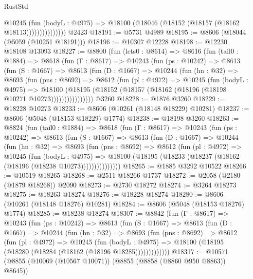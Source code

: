 \begin{lexlean}{RustStd}
\begin{coremodule}
                      @10245
                        (fun (bodyL : @4975) =>
                        @18100 (@18046 (@18152 (@18157 (@18162 @18113)))))))))))))))
    @2423
@18191 := @5731 @4989
@18195 := @8606 (@18044 (@5059 (@10251 @18191)))
@18196 := @10307 @12228
@18198 := @12230 @18108 @13093
@18227 := @8800
    (fun (lets0 : @8614) =>
    @8616
      (fun (tail0 : @1884) =>
      @8618
        (fun (Γ : @8617) =>
        @10243
          (fun (ps : @10242) =>
          @8613
            (fun (S : @1667) =>
            @8613
              (fun (D : @1667) =>
              @10244
                (fun (hn : @32) =>
                @8693
                  (fun (pns : @8692) =>
                  @8612
                    (fun (pl : @4972) =>
                    @10245
                      (fun (bodyL : @4975) =>
                      @18100
                        (@18195
                          (@18152 (@18157 (@18162 (@18196 (@18198 @10271 @10273))))))))))))))))
    @3260
@18228 := @1876 @3260
@18229 := @18228 @10273
@18233 := @8606 (@10261 (@18148 @18229) @10281)
@18237 := @8606 (@5048 (@18153 @18229) @1774)
@18238 := @18198 @3260
@18263 := @8824
    (fun (tail0 : @1884) =>
    @8618
      (fun (Γ : @8617) =>
      @10243
        (fun (ps : @10242) =>
        @8613
          (fun (S : @1667) =>
          @8613
            (fun (D : @1667) =>
            @10244
              (fun (hn : @32) =>
              @8693
                (fun (pns : @8692) =>
                @8612
                  (fun (pl : @4972) =>
                  @10245
                    (fun (bodyL : @4975) =>
                    @18100 (@18195 (@18233 (@18237 (@18162 (@18196 (@18238 @10273)))))))))))))))
@18265 := @1885 @3292 @10522
@18266 := @10519 @18265
@18268 := @2511 @18266 @1737
@18272 := @2058 (@2180 (@1879 @18268)) @2090
@18273 := @2730 @18272
@18274 := @3264 @18273
@18275 := @18263 @18274
@18276 := @18228 @18274
@18280 := @8606 (@10261 (@18148 @18276) @10281)
@18284 := @8606 (@5048 (@18153 @18276) @1774)
@18285 := @18238 @18274
@18307 := @8842
    (fun (Γ : @8617) =>
    @10243
      (fun (ps : @10242) =>
      @8613
        (fun (S : @1667) =>
        @8613
          (fun (D : @1667) =>
          @10244
            (fun (hn : @32) =>
            @8693
              (fun (pns : @8692) =>
              @8612
                (fun (pl : @4972) =>
                @10245
                  (fun (bodyL : @4975) =>
                  @18100 (@18195 (@18280 (@18284 (@18162 (@18196 @18285)))))))))))))
@18317 := @10571 (@8855 (@10069 (@10567 @10071)) (@8855 (@8858 (@8860 @950 @8863)) @8645))

\end{coremodule}
\end{lexlean}
